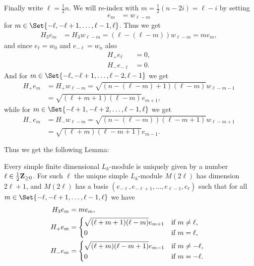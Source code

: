 Finally write $\ell = \tfrac{1}{2}n$. We will re-index with $m=\tfrac{1}{2}(n-2i)=\ell-i$ by setting
\begin{align*}
  e_m &= w_{\ell-m}
\end{align*}
for $m\in\Set{-\ell,-\ell+1,\dotsc,\ell-1,\ell}$. Thus we get
\begin{align*}
  H_3e_m &= H_3w_{\ell-m} = (\ell-(\ell-m))w_{\ell-m} = me_m,
\end{align*}
and since $e_{\ell} = w_0$ and $e_{-\ell} = w_n$ also
\begin{align*}
  H_+e_{\ell} &= 0,\\
  H_-e_{-\ell} &= 0.
\end{align*}
And for $m\in\Set{-\ell,-\ell+1,\dotsc,\ell-2,\ell-1}$ we get
\begin{align*}
  H_+e_m &= H_+w_{\ell-m} = \sqrt{(n-(\ell-m)+1)(\ell-m)}w_{\ell-m-1} \\
  &= \sqrt{(\ell+m+1)(\ell-m)}e_{m+1},
\end{align*}
while for $m\in\Set{-\ell+1,-\ell+2,\dotsc,\ell-1,\ell}$ we get
\begin{align*}
  H_-e_m &= H_-w_{\ell-m} = \sqrt{(n-(\ell-m))(\ell-m+1)}w_{\ell-m+1} \\
  &= \sqrt{(\ell+m)(\ell-m+1)}e_{m-1}.
\end{align*}

Thus we get the following Lemma:
\begin{lemma}\label{lem:modulebasis}
  Every simple finite dimensional $L_k$-module is uniquely given by a number $\ell\in\tfrac{1}{2}\mathbf{Z}_{\geq 0}$. For such $\ell$ the unique simple $L_k$-module $M(2\ell)$ has dimension $2\ell+1$, and $M(2\ell)$ has a basis $(e_{-\ell},e_{-\ell+1},\dotsc,e_{\ell-1},e_\ell)$ such that for all $m\in\Set{-\ell,-\ell+1,\dotsc,\ell-1,\ell}$ we have
  \begin{align}
    \begin{split}
      H_3e_m &= me_m,\label{eq:modulerels} \\
      H_+e_m &=
      \begin{dcases*}
        \sqrt{(\ell+m+1)(\ell-m)}e_{m+1} & if $m\neq \ell$, \\
        0 & if $m=\ell$,
      \end{dcases*} \\
      H_-e_m &=
      \begin{dcases*}
        \sqrt{(\ell+m)(\ell-m+1)}e_{m-1} & if $m\neq -\ell$, \\
        0 & if $m=-\ell$.
      \end{dcases*}
    \end{split}
  \end{align}
\end{lemma}

